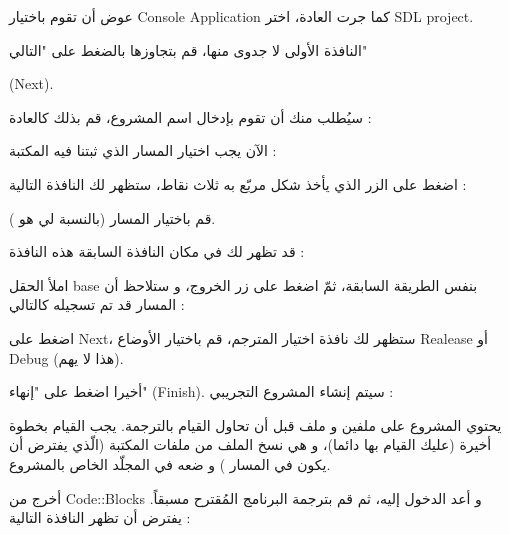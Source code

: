 عوض أن تقوم باختيار 
\textenglish{Console Application}
كما جرت العادة، اختر 
\textenglish{SDL project}.


النافذة الأولى لا جدوى منها، قم بتجاوزها بالضغط على "التالي"

(\textenglish{Next}).


سيُطلب منك أن تقوم بإدخال اسم المشروع، قم بذلك كالعادة :


الآن يجب اختيار المسار الذي ثبتنا فيه المكتبة :


اضغط على الزر الذي يأخذ شكل مربّع به ثلاث نقاط، ستظهر لك النافذة التالية :


قم باختيار المسار (بالنسبة لي هو
).

قد تظهر لك في مكان النافذة السابقة هذه النافذة :


املأ الحقل
\textenglish{base}
بنفس الطريقة السابقة، ثمّ اضغط على زر الخروج، و ستلاحظ أن المسار قد تم تسجيله كالتالي :


اضغط على
\textenglish{Next}،
 ستظهر لك نافذة اختيار المترجم، قم باختيار الأوضاع
\textenglish{Realease}
أو
\textenglish{Debug}
(هذا لا يهم).

أخيرا اضغط على "إنهاء"
(\textenglish{Finish}).
 سيتم إنشاء المشروع التجريبي :
 

يحتوي المشروع على ملفين 
و ملف
قبل أن تحاول القيام بالترجمة. يجب القيام بخطوة أخيرة (عليك القيام بها دائما)، و هي نسخ الملف 
من ملفات المكتبة (الّذي يفترض أن يكون في المسار 
)
و ضعه في المجلّد الخاص بالمشروع.


أخرج من 
\textenglish{Code::Blocks}
و أعد الدخول إليه، ثم قم بترجمة البرنامج المُقترح مسبقاً. يفترض أن تظهر النافذة التالية :

